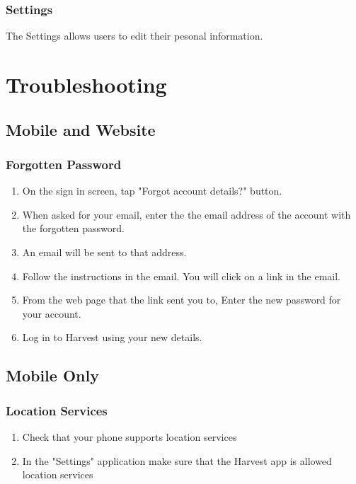 \documentclass[11pt]{article}
\begin{document}
\subsubsection{Settings}
\label{webSettings}

The Settings allows users to edit their pesonal information.

\newpage
\section{Troubleshooting}

\subsection{Mobile and Website}

\subsubsection{Forgotten Password}
\begin{enumerate}
\item On the sign in screen, tap "Forgot account details?" button.
\item When asked for your email, enter the the email address of the account with the forgotten password.
\item An email will be sent to that address.
\item Follow the instructions in the email. You will click on a link in the email.
\item From the web page that the link sent you to, Enter the new password for your account.
\item Log in to Harvest using your new details.
\end{enumerate}

\subsection{Mobile Only}
\subsubsection{Location Services}
\begin{enumerate}
\item Check that your phone supports location services
\item In the "Settings" application make sure that the Harvest app is allowed location services
\end{enumerate}
\end{document}
